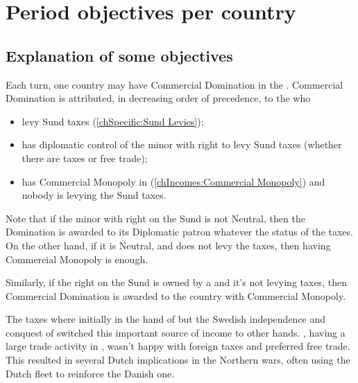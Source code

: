 \section{Period objectives per country}
\label{chVictories:objectives}

\subsection{Explanation of some objectives}



 Each turn, one
country may have Commercial Domination in the
. Commercial Domination is attributed, in decreasing
order of precedence, to the \MAJ who
\begin{itemize}
\item levy Sund taxes (\ref{chSpecific:Sund Levies});
\item has diplomatic control of the minor with right to levy Sund taxes
  (whether there are taxes or free trade);
\item has Commercial Monopoly in 
  (\ref{chIncomes:Commercial Monopoly}) and nobody is levying the Sund
  taxes.
\end{itemize}

\begin{designnote}
  Note that if the minor with right on the Sund is not Neutral, then the
  Domination is awarded to its Diplomatic patron whatever the status of
  the taxes. On the other hand, if it is Neutral, and does not levy the
  taxes, then having Commercial Monopoly is enough.

  Similarly, if the right on the Sund is owned by a \MAJ and it's not
  levying taxes, then Commercial Domination is awarded to the country
  with Commercial Monopoly.
\end{designnote}

\begin{histoire}
  The taxes where initially in the hand of \paysDanemark but the Swedish
  independence and conquest of \provinceSkane switched this important
  source of income to other hands. \HOL, having a large trade activity
  in , wasn't happy with foreign taxes and preferred free
  trade. This resulted in several Dutch implications in the Northern
  wars, often using the Dutch fleet to reinforce the Danish one.
\end{histoire}

